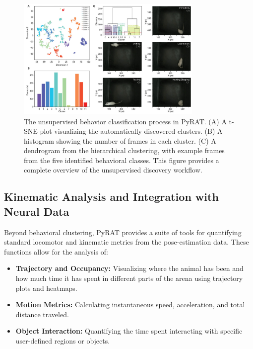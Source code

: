 \begin{figure}[H]
    \centering
    \includegraphics[width=0.8\textwidth]{archivos/figuras/pyrat_3.jpg} 
    \caption{The unsupervised behavior classification process in PyRAT. (A) A t-SNE plot visualizing the automatically discovered clusters. (B) A histogram showing the number of frames in each cluster. (C) A dendrogram from the hierarchical clustering, with example frames from the five identified behavioral classes. This figure provides a complete overview of the unsupervised discovery workflow.}
    \label{fig:unsupervised_clustering}
\end{figure}

\subsection{Kinematic Analysis and Integration with Neural Data}

Beyond behavioral clustering, PyRAT provides a suite of tools for quantifying standard locomotor and kinematic metrics from the pose-estimation data. These functions allow for the analysis of:
\begin{itemize}
    \item \textbf{Trajectory and Occupancy:} Visualizing where the animal has been and how much time it has spent in different parts of the arena using trajectory plots and heatmaps.
    \item \textbf{Motion Metrics:} Calculating instantaneous speed, acceleration, and total distance traveled.
    \item \textbf{Object Interaction:} Quantifying the time spent interacting with specific user-defined regions or objects.
\end{itemize}

